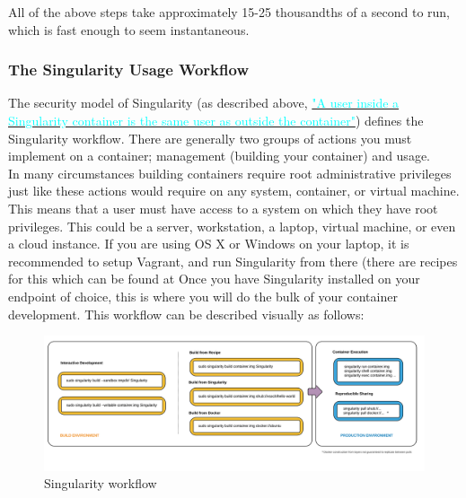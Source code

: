 \documentclass[a4paper]{article}
\begin{document}
All of the above steps take approximately 15-25 thousandths of a second to run, which is fast enough to seem instantaneous.
\subsubsection{The Singularity Usage Workflow}

The security model of Singularity (as described above, \hyperref[sec:securityandpriviledge]{{\textcolor{cyan}{"A user inside a Singularity container is the same user as outside the container"}}}) defines the Singularity workflow. There are generally two groups of actions you must implement on a container; management (building your container) and usage.\\[0.1in]

In many circumstances building containers require root administrative privileges just like these actions would require on any system, container, or virtual machine. This means that a user must have access to a system on which they have root privileges. This could be a server, workstation, a laptop, virtual machine, or even a cloud instance. If you are using OS X or Windows on your laptop, it is recommended to setup Vagrant, and run Singularity from there (there are recipes for this which can be found at  Once you have Singularity installed on your endpoint of choice, this is where you will do the bulk of your container development.
This workflow can be described visually as follows:
\\[0.1in]
\begin{figure}[h]
\centering
\hspace*{-0.62in}
\includegraphics{flow.png}
\caption{Singularity workflow}
\end{figure}
\end{document}
